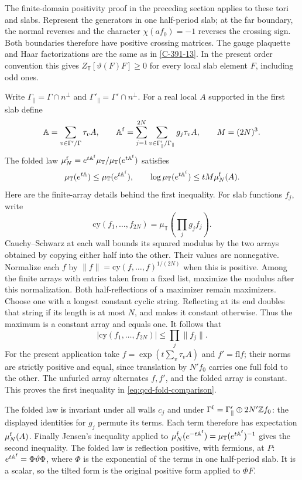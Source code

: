 \documentclass[11pt,letterpaper,reqno]{amsart}
\theoremstyle{definition}
\theoremstyle{remark}
\begin{document}
The finite-domain positivity proof in the preceding section
applies to these tori and slabs. Represent the generators in one
half-period slab; at the far boundary, the normal reverses and
the character $\chi(af_0)=-1$ reverses the crossing sign.
Both boundaries therefore have positive crossing matrices.
The gauge plaquette and Haar factorizations are the same as in
\cref{C-391-13}. In the present order convention this gives
$Z_{\mathbb T}[\vartheta(F)F]\ge0$ for every local slab
element $F$, including odd ones.

Write $\Gamma_\parallel=\Gamma\cap n^\perp$ and
$\Gamma'_\parallel=\Gamma'\cap n^\perp$.
For a real local $A$ supported in the first slab define
\[
 \mathbb A=\sum_{v\in\Gamma'/\Gamma}\tau_vA,\qquad
 \mathbb A^{\rm f}=\sum_{j=1}^{2N}
       \sum_{v\in\Gamma'_\parallel/\Gamma_\parallel}g_j\tau_vA,
 \qquad M=(2N)^3.
\]
The folded law $\mu_N^{\rm f}=e^{t\mathbb A^{\rm f}}
\mu_{\mathbb T}/\mu_{\mathbb T}(e^{t\mathbb A^{\rm f}})$ satisfies
\begin{equation}\label{eq:qcd-fold-comparison}
 \mu_{\mathbb T}(e^{t\mathbb A})
      \le\mu_{\mathbb T}(e^{t\mathbb A^{\rm f}}),\qquad
 \log\mu_{\mathbb T}(e^{t\mathbb A^{\rm f}})
                                      \le tM\mu_N^{\rm f}(A).
\end{equation}
Here are the finite-array details behind the first inequality.
For slab functions $f_j$, write
\[
 \mathrm{cy}(f_1,\ldots,f_{2N})=\mu_{\mathbb T}(\prod_jg_jf_j).
\]
Cauchy--Schwarz at each wall bounds its squared modulus by the
two arrays obtained by copying either half into the other. Their
values are nonnegative. Normalize each $f$ by
$\|f\|=\mathrm{cy}(f,\ldots,f)^{1/(2N)}$ when this is positive.
Among the finite arrays with entries taken from a fixed list,
maximize the modulus after this normalization. Both half-reflections
of a maximizer remain maximizers. Choose one with a longest
constant cyclic string. Reflecting at its end doubles that string
if its length is at most $N$, and makes it constant otherwise.
Thus the maximum is a constant array and equals one. It follows that
\[
 |\mathrm{cy}(f_1,\ldots,f_{2N})|\le\prod_j\|f_j\|.
\]
For the present application take
$f=\exp(t\sum_v\tau_vA)$ and $f'=\mathrm{fl}f$;
their norms are strictly positive and equal, since translation
by $N'f_0$ carries one full fold to the other.
The unfurled array alternates $f,f'$, and the folded array is
constant. This proves the first inequality in
\eqref{eq:qcd-fold-comparison}.

The folded law is invariant under all walls $c_j$ and under
$\Gamma^{\rm f}=\Gamma'_\parallel\oplus2N'\mathbb Zf_0$:
the displayed identities for $g_j$ permute its terms. Each term
therefore has expectation $\mu_N^{\rm f}(A)$. Finally Jensen's
inequality applied to
$\mu_N^{\rm f}(e^{-t\mathbb A^{\rm f}})
  =\mu_{\mathbb T}(e^{t\mathbb A^{\rm f}})^{-1}$
gives the second inequality.
The folded law is reflection positive, with fermions, at $P$:
$e^{t\mathbb A^{\rm f}}=\Phi\vartheta\Phi$, where $\Phi$
is the exponential of the terms in one half-period slab.
It is a scalar, so the tilted form is the original positive
form applied to $\Phi F$.
\end{document}
